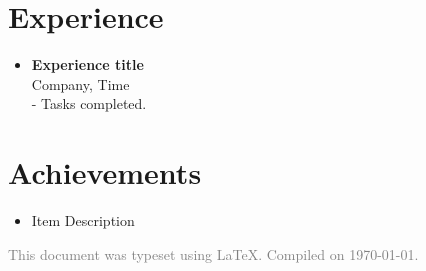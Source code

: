\documentclass[11pt]{article}
\begin{document}
\section*{Experience}
\vspace{-0.1in}
\begin{itemize}[leftmargin=*]
    \item \textbf{Experience title} \\
    Company, Time \\
    - Tasks completed.
\end{itemize}

\section*{Achievements}
\vspace{-0.1in}
\begin{itemize}[leftmargin=*]
    \item Item Description
\end{itemize}

\vspace{0.2in}
\begin{center}
\footnotesize
\textcolor{gray}{This document was typeset using \LaTeX. Compiled on \today.}
\end{center}
\end{document}
